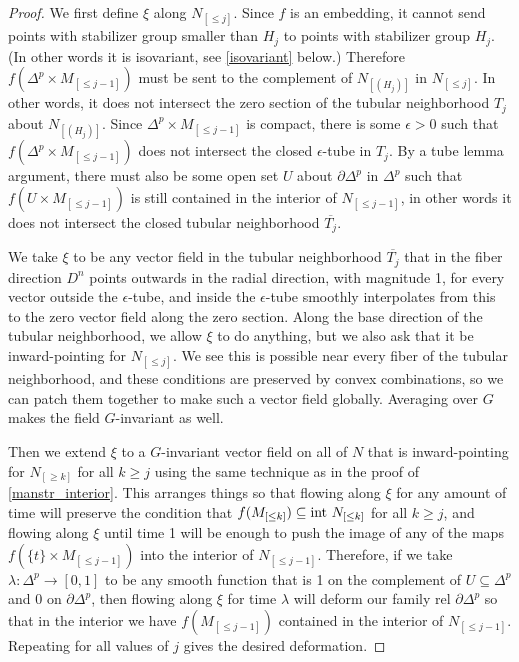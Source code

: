 \documentclass[11pt]{amsart}
\theoremstyle{definition}
\numberwithin{equation}{section}
\numberwithin{figure}{section}
\begin{document}
\begin{proof}
	We first define $\xi$ along $N_{[\leq j]}$. Since $f$ is an embedding, it cannot send points with stabilizer group smaller than $H_j$ to points with stabilizer group $H_j$. (In other words it is isovariant, see \autoref{isovariant} below.) Therefore $f(\Delta^p \times M_{[\leq j-1]})$ must be sent to the complement of $N_{[(H_j)]}$ in $N_{[\leq j]}$. In other words, it does not intersect the zero section of the tubular neighborhood $T_j$ about $N_{[(H_j)]}$. Since $\Delta^p \times M_{[\leq j-1]}$ is compact, there is some $\epsilon > 0$ such that $f(\Delta^p \times M_{[\leq j-1]})$ does not intersect the closed $\epsilon$-tube in $T_j$. By a tube lemma argument, there must also be some open set $U$ about $\partial\Delta^p$ in $\Delta^p$ such that $f(U \times M_{[\leq j-1]})$ is still contained in the interior of $N_{[\leq j-1]}$, in other words it does not intersect the closed tubular neighborhood $\overline{T_j}$.
	
	We take $\xi$ to be any vector field in the tubular neighborhood $\overline{T_j}$ that in the fiber direction $D^n$ points outwards in the radial direction, with magnitude 1, for every vector outside the $\epsilon$-tube, and inside the $\epsilon$-tube smoothly interpolates from this to the zero vector field along the zero section. Along the base direction of the tubular neighborhood, we allow $\xi$ to do anything, but we also ask that it be inward-pointing for $N_{[\leq j]}$. We see this is possible near every fiber of the tubular neighborhood, and these conditions are preserved by convex combinations, so we can patch them together to make such a vector field globally. Averaging over $G$ makes the field $G$-invariant as well.
	
	Then we extend $\xi$ to a $G$-invariant vector field on all of $N$ that is inward-pointing for $N_{[\geq k]}$ for all $k \geq j$ using the same technique as in the proof of \autoref{manstr_interior}. This arranges things so that flowing along $\xi$ for any amount of time will preserve the condition that $f(M_{[\leq k]}) \subseteq \textup{int }N_{[\leq k]}$ for all $k \geq j$, and flowing along $\xi$ until time 1 will be enough to push the image of any of the maps $f(\{t\} \times M_{[\leq j-1]})$ into the interior of $N_{[\leq j-1]}$. Therefore, if we take $\lambda\colon \Delta^p \to [0,1]$ to be any smooth function that is 1 on the complement of $U \subseteq \Delta^p$ and 0 on $\partial \Delta^p$, then flowing along $\xi$ for time $\lambda$ will deform our family rel $\partial \Delta^p$ so that in the interior we have $f(M_{[\leq j-1]})$ contained in the interior of $N_{[\leq j-1]}$. Repeating for all values of $j$ gives the desired deformation.
\end{proof}
	
\end{document}
